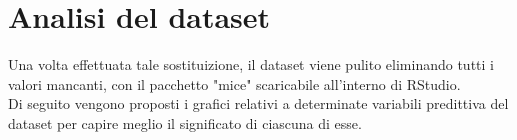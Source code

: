 \section{Analisi del dataset}


Una volta effettuata tale sostituizione, il dataset viene pulito eliminando tutti i valori mancanti, con il pacchetto "mice" scaricabile all'interno di RStudio.\\

Di seguito vengono proposti i grafici relativi a determinate variabili predittiva del dataset per capire meglio il significato di ciascuna di esse.











